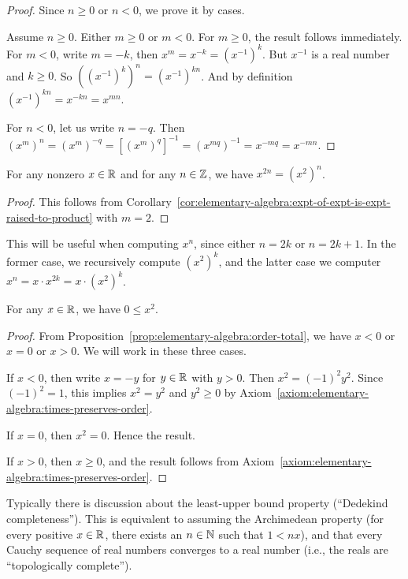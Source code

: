 \begin{proof}
Since $n\geq 0$ or $n < 0$, we prove it by cases.

Assume $n\geq 0$. Either $m\geq0$ or $m < 0$. For $m\geq 0$,
the result follows immediately. For $m < 0$, write $m = -k$, then
$x^{m} = x^{-k} = (x^{-1})^{k}$. But $x^{-1}$ is a real number and $k\geq0$.
So $((x^{-1})^{k})^{n}=(x^{-1})^{kn}$. And by definition $(x^{-1})^{kn}=x^{-kn}=x^{mn}$.

For $n < 0$, let us write $n=-q$. Then $(x^{m})^{n} = (x^{m})^{-q} = [(x^{m})^{q}]^{-1}=(x^{mq})^{-1}=x^{-mq}=x^{-mn}$.
\end{proof}

\begin{corollary}
For any nonzero $x\in\mathbb{R}$ and for any $n\in\mathbb{Z}$, we have $x^{2n} = (x^{2})^{n}$.
\end{corollary}

\begin{proof}
This follows from Corollary~\ref{cor:elementary-algebra:expt-of-expt-is-expt-raised-to-product}
with $m=2$.
\end{proof}

\begin{remark}
This will be useful when computing $x^{n}$, since either $n=2k$ or
$n=2k+1$. In the former case, we recursively compute $(x^{2})^{k}$, and
the latter case we computer $x^{n} = x\cdot x^{2k} = x\cdot (x^{2})^{k}$.
\end{remark}

\begin{proposition}
For any $x\in\mathbb{R}$, we have $0\leq x^{2}$.
\end{proposition}

\begin{proof}
From Proposition~\ref{prop:elementary-algebra:order-total},
we have $x < 0$ or $x = 0$ or $x > 0$. We will work in these three
cases.

If $x < 0$, then write $x = -y$ for $y\in\mathbb{R}$ with $y > 0$. Then $x^{2} = (-1)^{2}y^{2}$.
Since $(-1)^{2} = 1$, this implies $x^{2} = y^{2}$ and $y^{2}\geq 0$ by Axiom~\ref{axiom:elementary-algebra:times-preserves-order}.

If $x = 0$, then $x^{2}=0$. Hence the result.

If $x > 0$, then $x\geq 0$, and the result follows from Axiom~\ref{axiom:elementary-algebra:times-preserves-order}.
\end{proof}


Typically there is discussion about the least-upper bound property
(``Dedekind completeness''). This is equivalent to assuming the
Archimedean property (for every positive $x\in\mathbb{R}$, there exists an
$n\in\mathbb{N}$ such that $1 < nx$), and that every Cauchy sequence of real numbers
converges to a real number (i.e., the reals are ``topologically complete'').


